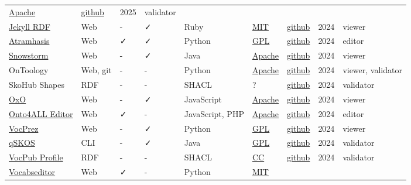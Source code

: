 \documentclass[
  DIV=10]{article}
\begin{document}
\begin{longtable}[]{@{}lllllllll@{}}
\href{https://spdx.org/licenses/Apache-2.0}{Apache} &
\href{https://github.com/oeg-upm/fair_ontologies}{github} & 2025 &
validator \\
\href{https://github.com/AKSW/jekyll-rdf}{Jekyll RDF} & Web & - & ✓ &
Ruby & \href{https://spdx.org/licenses/MIT}{MIT} &
\href{https://github.com/AKSW/jekyll-rdf}{github} & 2024 & viewer \\
\href{https://atramhasis.readthedocs.io/en/latest/}{Atramhasis} & Web &
✓ & ✓ & Python & \href{https://spdx.org/licenses/GPL-3.0-or-later}{GPL}
& \href{https://github.com/OnroerendErfgoed/atramhasis}{github} & 2024 &
editor \\
\href{https://github.com/IHTSDO/snowstorm}{Snowstorm} & Web & - & ✓ &
Java & \href{https://spdx.org/licenses/Apache-2.0}{Apache} &
\href{https://github.com/IHTSDO/snowstorm}{github} & 2024 & viewer \\
OnToology & Web, git & - & - & Python &
\href{https://spdx.org/licenses/Apache-2.0}{Apache} &
\href{https://github.com/OnToology/OnToology}{github} & 2024 & viewer,
validator \\
SkoHub Shapes & RDF & - & - & SHACL & ? &
\href{https://github.com/skohub-io/skohub-shapes}{github} & 2024 &
validator \\
\href{https://www.ebi.ac.uk/spot/oxo/}{OxO} & Web & - & ✓ & JavaScript &
\href{https://spdx.org/licenses/Apache-2.0}{Apache} &
\href{https://github.com/EBISPOT/OXO}{github} & 2024 & viewer \\
\href{https://onto4all.com/}{Onto4ALL Editor} & Web & ✓ & - &
JavaScript, PHP & \href{https://spdx.org/licenses/Apache-2.0}{Apache} &
\href{https://github.com/NCOR-BR/onto4all}{github} & 2024 & editor \\
\href{https://github.com/RDFLib/VocPrez}{VocPrez} & Web & - & ✓ & Python
& \href{https://spdx.org/licenses/GPL-3.0-or-later}{GPL} &
\href{https://github.com/RDFLib/VocPrez}{github} & 2024 & viewer \\
\href{https://github.com/cmader/qSKOS/}{qSKOS} & CLI & - & ✓ & Java &
\href{https://spdx.org/licenses/GPL-3.0-or-later}{GPL} &
\href{https://github.com/cmader/qSKOS/}{github} & 2024 & validator \\
\href{https://surroundaustralia.github.io/vocpub-profile/profile.html}{VocPub
Profile} & RDF & - & - & SHACL &
\href{https://spdx.org/licenses/CC-BY-4.0}{CC} &
\href{https://github.com/AGLDWG/vocpub-profile/}{github} & 2024 &
validator \\
\href{https://vocabseditor.acdh.oeaw.ac.at/}{Vocabseditor} & Web & ✓ & -
& Python & \href{https://spdx.org/licenses/MIT}{MIT} &

\end{longtable}
\end{document}
